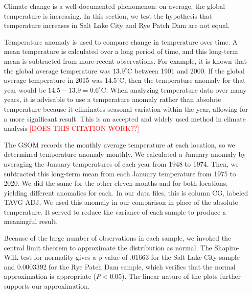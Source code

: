 Climate change is a well-documented phenomenon: on average, the global temperature is increasing. In this section, we test the hypothesis that temperature increases in Salt Lake City and Rye Patch Dam are not equal.

Temperature anomaly is used to compare change in temperature over time. A mean temperature is calculated over a long period of time, and this long-term mean is subtracted from more recent observations. For example, it is known that the global average temperature was $13.9^{\circ}$C between 1901 and 2000. If the global average temperature in 2015 was $14.5^{\circ}$C, then the temperature anomaly for that year would be $14.5 - 13.9 = 0.6^{\circ}$C. When analyzing temperature data over many years, it is advisable to use a temperature anomaly rather than absolute temperature because it eliminates seasonal variation within the year, allowing for a more significant result. This is an accepted and widely used method in climate analysis \textcolor{red}{[DOES THIS CITATION WORK??]} \cite{temp_anomaly}

The GSOM records the monthly average temperature at each location, so we determined temperature anomaly monthly. We calculated a January anomaly by averaging the January temperatures of each year from 1948 to 1974. Then, we subtracted this long-term mean from each January temperature from 1975 to 2020. We did the same for the other eleven months and for both locations, yielding different anomalies for each. In our data files, this is column CG, labeled TAVG ADJ. We used this anomaly in our comparison in place of the absolute temperature. It served to reduce the variance of each sample to produce a meaningful result.

Because of the large number of observations in each sample, we invoked the central limit theorem to approximate the distribution as normal. The Shapiro-Wilk test for normality gives a p-value of .01663 for the Salt Lake City sample and 0.0003392 for the Rye Patch Dam sample, which verifies that the normal approximation is appropriate ($P < 0.05$). The linear nature of the plots further supports our approximation.

